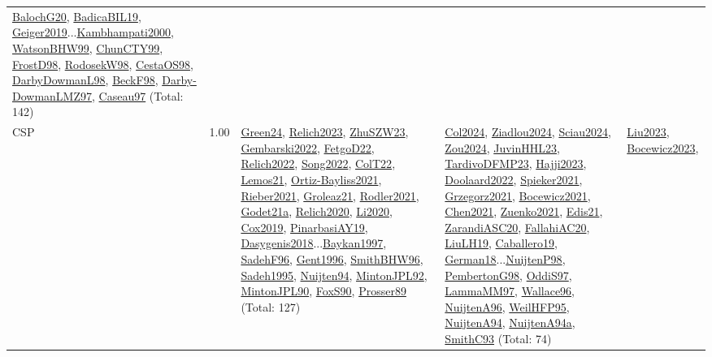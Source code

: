 {\begin{longtable}{p{3cm}r>{\raggedright\arraybackslash}p{6cm}>{\raggedright\arraybackslash}p{6cm}>{\raggedright\arraybackslash}p{8cm}}
\hyperref[detail:BalochG20]{BalochG20}, \hyperref[detail:BadicaBIL19]{BadicaBIL19}, \hyperref[detail:Geiger2019]{Geiger2019}...\hyperref[detail:Kambhampati2000]{Kambhampati2000}, \hyperref[detail:WatsonBHW99]{WatsonBHW99}, \hyperref[detail:ChunCTY99]{ChunCTY99}, \hyperref[detail:FrostD98]{FrostD98}, \hyperref[detail:RodosekW98]{RodosekW98}, \hyperref[detail:CestaOS98]{CestaOS98}, \hyperref[detail:DarbyDowmanL98]{DarbyDowmanL98}, \hyperref[detail:BeckF98]{BeckF98}, \hyperref[detail:Darby-DowmanLMZ97]{Darby-DowmanLMZ97}, \hyperref[detail:Caseau97]{Caseau97} (Total: 142)\\
\index{CSP}\index{CP!CSP}CSP &  1.00 & \hyperref[detail:Green24]{Green24}, \hyperref[detail:Relich2023]{Relich2023}, \hyperref[detail:ZhuSZW23]{ZhuSZW23}, \hyperref[detail:Gembarski2022]{Gembarski2022}, \hyperref[detail:FetgoD22]{FetgoD22}, \hyperref[detail:Relich2022]{Relich2022}, \hyperref[detail:Song2022]{Song2022}, \hyperref[detail:ColT22]{ColT22}, \hyperref[detail:Lemos21]{Lemos21}, \hyperref[detail:Ortiz-Bayliss2021]{Ortiz-Bayliss2021}, \hyperref[detail:Rieber2021]{Rieber2021}, \hyperref[detail:Groleaz21]{Groleaz21}, \hyperref[detail:Rodler2021]{Rodler2021}, \hyperref[detail:Godet21a]{Godet21a}, \hyperref[detail:Relich2020]{Relich2020}, \hyperref[detail:Li2020]{Li2020}, \hyperref[detail:Cox2019]{Cox2019}, \hyperref[detail:PinarbasiAY19]{PinarbasiAY19}, \hyperref[detail:Dasygenis2018]{Dasygenis2018}...\hyperref[detail:Baykan1997]{Baykan1997}, \hyperref[detail:SadehF96]{SadehF96}, \hyperref[detail:Gent1996]{Gent1996}, \hyperref[detail:SmithBHW96]{SmithBHW96}, \hyperref[detail:Sadeh1995]{Sadeh1995}, \hyperref[detail:Nuijten94]{Nuijten94}, \hyperref[detail:MintonJPL92]{MintonJPL92}, \hyperref[detail:MintonJPL90]{MintonJPL90}, \hyperref[detail:FoxS90]{FoxS90}, \hyperref[detail:Prosser89]{Prosser89} (Total: 127) & \hyperref[detail:Col2024]{Col2024}, \hyperref[detail:Ziadlou2024]{Ziadlou2024}, \hyperref[detail:Sciau2024]{Sciau2024}, \hyperref[detail:Zou2024]{Zou2024}, \hyperref[detail:JuvinHHL23]{JuvinHHL23}, \hyperref[detail:TardivoDFMP23]{TardivoDFMP23}, \hyperref[detail:Hajji2023]{Hajji2023}, \hyperref[detail:Doolaard2022]{Doolaard2022}, \hyperref[detail:Spieker2021]{Spieker2021}, \hyperref[detail:Grzegorz2021]{Grzegorz2021}, \hyperref[detail:Bocewicz2021]{Bocewicz2021}, \hyperref[detail:Chen2021]{Chen2021}, \hyperref[detail:Zuenko2021]{Zuenko2021}, \hyperref[detail:Edis21]{Edis21}, \hyperref[detail:ZarandiASC20]{ZarandiASC20}, \hyperref[detail:FallahiAC20]{FallahiAC20}, \hyperref[detail:LiuLH19]{LiuLH19}, \hyperref[detail:Caballero19]{Caballero19}, \hyperref[detail:German18]{German18}...\hyperref[detail:NuijtenP98]{NuijtenP98}, \hyperref[detail:PembertonG98]{PembertonG98}, \hyperref[detail:OddiS97]{OddiS97}, \hyperref[detail:LammaMM97]{LammaMM97}, \hyperref[detail:Wallace96]{Wallace96}, \hyperref[detail:NuijtenA96]{NuijtenA96}, \hyperref[detail:WeilHFP95]{WeilHFP95}, \hyperref[detail:NuijtenA94]{NuijtenA94}, \hyperref[detail:NuijtenA94a]{NuijtenA94a}, \hyperref[detail:SmithC93]{SmithC93} (Total: 74) & \hyperref[detail:Liu2023]{Liu2023}, \hyperref[detail:Bocewicz2023]{Bocewicz2023}, 
\end{longtable}}
